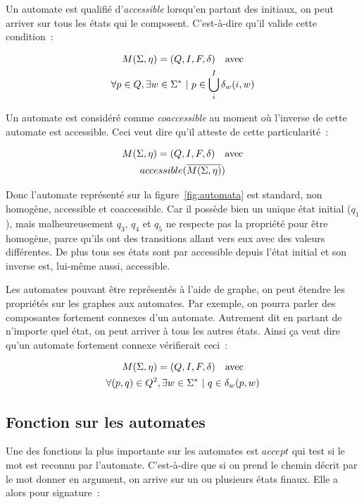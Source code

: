 \documentclass[12pt]{article}
\begin{document}
Un automate est qualifié d'\textit{accessible} lorsqu'en partant des initiaux,
on peut arriver sur tous les états qui le composent. C'est-à-dire qu'il valide
cette condition~:

\begin{gather}
    M(\Sigma, \eta) = (Q, I, F, \delta) \quad \text{avec} \\
    \forall p \in Q, \exists w \in \Sigma^* ~|~ p \in \bigcup_{i}^{I} \delta_w(i, w) \notag
\end{gather}

Un automate est considéré comme \textit{coaccessible} au moment où l'inverse de
cette automate est accessible. Ceci veut dire qu'il atteste de cette
particularité~:

\begin{gather}
    M(\Sigma, \eta) = (Q, I, F, \delta) \quad \text{avec} \\
    accessible(\overline{M(\Sigma, \eta)}) \notag
\end{gather}

Donc l'automate représenté sur la figure~\ref{fig:automata} est standard, non
homogène, accessible et coaccessible. Car il possède bien un unique état
initial (\(q_1\)), mais malheureusement \(q_3\), \(q_4\) et \(q_5\) ne respecte
pas la propriété pour être homogène, parce qu'ils ont des transitions allant
vers eux avec des valeurs différentes. De plus tous ses états sont par
accessible depuis l'état initial et son inverse est, lui-même aussi,
accessible.

\vphantom{}

Les automates pouvant être représentés à l'aide de graphe, on peut étendre les
propriétés sur les graphes aux automates. Par exemple, on pourra parler des
composantes fortement connexes d'un automate. Autrement dit en partant de
n'importe quel état, on peut arriver à tous les autres états. Ainsi ça veut
dire qu'un automate fortement connexe vérifierait ceci~:

\begin{gather}
    M(\Sigma, \eta) = (Q, I, F, \delta) \quad \text{avec} \\
    \forall (p, q) \in Q^2, \exists w \in \Sigma^* ~|~ q \in \delta_w(p, w) \notag
\end{gather}

\subsection{Fonction sur les automates}

Une des fonctions la plus importante sur les automates est \(accept\) qui test
si le mot est reconnu par l'automate. C'est-à-dire que si on prend le chemin
décrit par le mot donner en argument, on arrive sur un ou plusieurs états
finaux. Elle a alors pour signature~:
\end{document}
